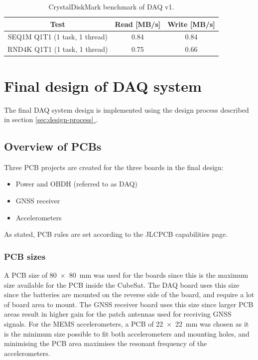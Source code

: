 \documentclass{report}
\newcommand*{\fullref}[1]{\hyperref[{#1}]{\ref*{#1} \nameref*{#1}}}
\begin{document}
\begin{table}[H]
  \centering
  \begin{tabular}{|c|c|c|}
    Test                          & Read [MB/s] & Write [MB/s] \\
    \hline
    SEQ1M Q1T1 (1 task, 1 thread) & 0.84        & 0.84         \\
    RND4K Q1T1 (1 task, 1 thread) & 0.75        & 0.66         \\
  \end{tabular}
  \caption{CrystalDiskMark benchmark of DAQ v1.}
  \label{tabl:daq-v1-diskmark}
\end{table}

\chapter{Final design of DAQ system}

The final DAQ system design is implemented using the design process described in section \fullref{sec:design-process}.

\section{Overview of PCBs}

Three PCB projects are created for the three boards in the final design:
\begin{itemize}
  \item Power and OBDH (referred to as DAQ)
  \item GNSS receiver
  \item Accelerometers
\end{itemize}

As stated, PCB rules are set according to the JLCPCB capabilities page.

\subsection{PCB sizes}
A PCB size of \SI{80 x 80}{\milli\metre} was used for the  boards since this is the maximum size available for the PCB inside the CubeSat. The DAQ board uses this size since the batteries are mounted on the reverse side of the board, and require a lot of board area to mount. The GNSS receiver board uses this size since larger PCB areas result in higher gain for the patch antennas used for receiving GNSS signals. For the MEMS accelerometers, a PCB of \SI{22 x 22}{\milli\metre} was chosen as it is the minimum size possible to fit both accelerometers and mounting holes, and minimising the PCB area maximises the resonant frequency of the accelerometers.
\end{document}

